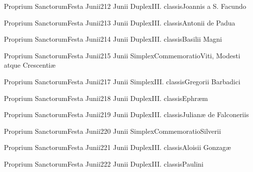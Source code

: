 \documentclass[invitatoriale-romanum.tex]{subfiles}
\begin{document}
	{Proprium Sanctorum}{Festa Junii}{2}{12 Junii}
	{Duplex}{III. classis}{Joannis a S. Facundo}
	{}
	{}

	{Proprium Sanctorum}{Festa Junii}{2}{13 Junii}
	{Duplex}{III. classis}{Antonii de Padua}
	{}
	{}

	{Proprium Sanctorum}{Festa Junii}{2}{14 Junii}
	{Duplex}{III. classis}{Basilii Magni}
	{}
	{}

	{Proprium Sanctorum}{Festa Junii}{2}{15 Junii}
	{Simplex}{Commemoratio}{Viti, Modesti atque Crescentiæ}
	{}
	{\invitferia}

	{Proprium Sanctorum}{Festa Junii}{2}{17 Junii}
	{Simplex}{III. classis}{Gregorii Barbadici}
	{}
	{}

	{Proprium Sanctorum}{Festa Junii}{2}{18 Junii}
	{Duplex}{III. classis}{Ephræm}
	{}
	{}

	{Proprium Sanctorum}{Festa Junii}{2}{19 Junii}
	{Duplex}{III. classis}{Julianæ de Falconeriis}
	{}
	{}

	{Proprium Sanctorum}{Festa Junii}{2}{20 Junii}
	{Simplex}{Commemoratio}{Silverii}
	{}
	{\invitferia}

	{Proprium Sanctorum}{Festa Junii}{2}{21 Junii}
	{Duplex}{III. classis}{Aloisii Gonzagæ}
	{}
	{}

	{Proprium Sanctorum}{Festa Junii}{2}{22 Junii}
	{Duplex}{III. classis}{Paulini}
	{}
	{}
\end{document}
